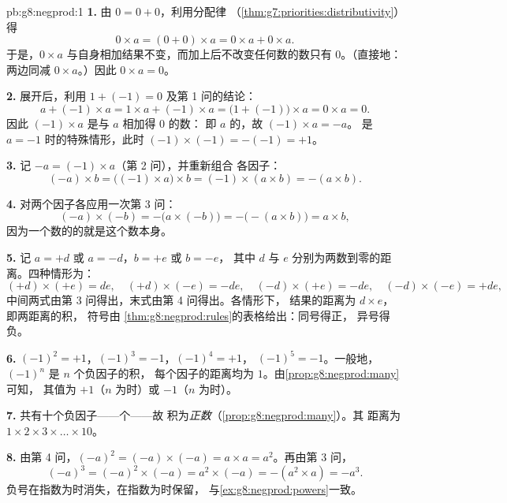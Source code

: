 \begin{solution}{pb:g8:negprod:1}
\textbf{1.} 由 $0 = 0 + 0$，利用分配律
（\cref{thm:g7:priorities:distributivity}）得
\[
0 \times a = (0 + 0) \times a = 0 \times a + 0 \times a .
\]
于是，$0 \times a$ 与自身相加结果不变，而加上后不改变任何数的数只有
$0$。（直接地：
两边同减 $0 \times a$。）因此 $0 \times a = 0$。

\textbf{2.} 展开后，利用 $1 + (-1) = 0$ 及第 1 问的结论：
\[
a + (-1) \times a
= 1 \times a + (-1) \times a
= \bigl(1 + (-1)\bigr) \times a
= 0 \times a = 0 .
\]
因此 $(-1) \times a$ 是与 $a$ 相加得 $0$ 的数：
即 $a$ 的，故 $(-1) \times a = -a$。
 是 $a = -1$ 时的特殊情形，此时
$(-1) \times (-1) = -(-1) = +1$。

\textbf{3.} 记 $-a = (-1) \times a$（第 2 问），并重新组合
各因子：
\[
(-a) \times b
= \bigl((-1) \times a\bigr) \times b
= (-1) \times (a \times b)
= -(a \times b) .
\]

\textbf{4.} 对两个因子各应用一次第 3 问：
\[
(-a) \times (-b)
= -\bigl(a \times (-b)\bigr)
= -\bigl(-(a \times b)\bigr)
= a \times b ,
\]
因为一个数的的就是这个数本身。

\textbf{5.} 记 $a = +d$ 或 $a = -d$，$b = +e$ 或 $b = -e$，
其中 $d$ 与 $e$ 分别为两数到零的距离。四种情形为：
\[
(+d) \times (+e) = de, \quad
(+d) \times (-e) = -de, \quad
(-d) \times (+e) = -de, \quad
(-d) \times (-e) = +de,
\]
中间两式由第 3 问得出，末式由第 4 问得出。各情形下，
结果的距离为 $d \times e$，即两距离的积，
符号由
\cref{thm:g8:negprod:rules}的表格给出：同号得正，
异号得负。

\textbf{6.} $(-1)^2 = +1$，$(-1)^3 = -1$，$(-1)^4 = +1$，
$(-1)^5 = -1$。一般地，$(-1)^n$ 是 $n$ 个负因子的积，
每个因子的距离均为 $1$。由\cref{prop:g8:negprod:many}可知，
其值为 $+1$（$n$ 为时）或 $-1$（$n$ 为时）。

\textbf{7.} 共有十个负因子——个——故
积为\emph{正数}（\cref{prop:g8:negprod:many}）。其
距离为 $1 \times 2 \times 3 \times \dots \times 10$。

\textbf{8.} 由第 4 问，$(-a)^2 = (-a) \times (-a) = a \times a =
a^2$。再由第 3 问，
\[
(-a)^3 = (-a)^2 \times (-a) = a^2 \times (-a) = -(a^2 \times a)
= -a^3 .
\]
负号在指数为时消失，在指数为时保留，
与\cref{ex:g8:negprod:powers}一致。


\end{solution}
